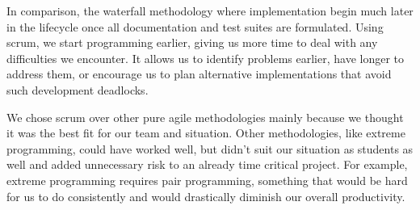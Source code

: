     In comparison, the waterfall methodology where implementation begin much later in the lifecycle once all
    documentation and test suites are formulated. Using scrum, we start programming earlier, giving us more time to deal
    with any difficulties we encounter. It allows us to identify problems earlier, have longer to address them, or
    encourage us to plan alternative implementations that avoid such development deadlocks.

    We chose scrum over other pure agile methodologies mainly because we thought it was the best fit for our team and
    situation. Other methodologies, like extreme programming, could have worked well, but didn’t suit our situation as
    students as well and added unnecessary risk to an already time critical project. For example, extreme programming
    requires pair programming, something that would be hard for us to do consistently and would drastically diminish our
    overall productivity.
